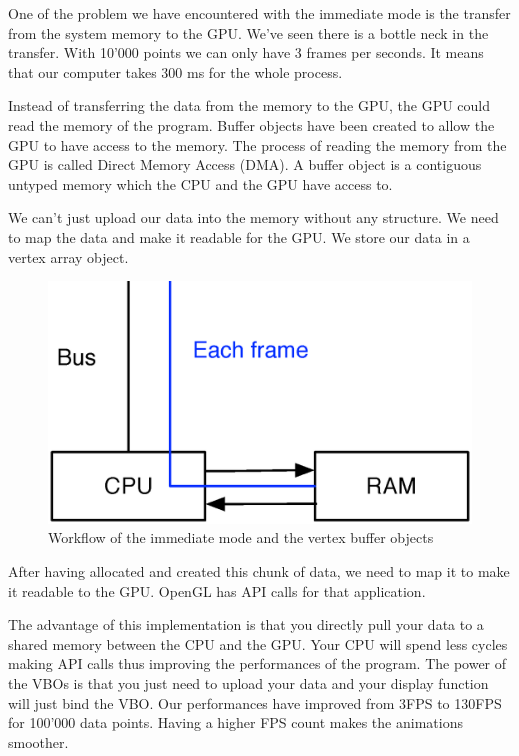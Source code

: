 One of the problem we have encountered with the immediate mode is the transfer from the system memory to the GPU.  We've seen there is a bottle neck in the transfer. With 10'000 points we can only have 3 frames per seconds. It means that our computer takes 300 ms for the whole process.

Instead of transferring the data from the memory to the GPU, the GPU could read the memory of the program. Buffer objects have been created to allow the GPU to have access to the memory. The process of reading the memory from the GPU is called Direct Memory Access (DMA). A buffer object is a contiguous untyped memory which the CPU and the GPU have access to.

We can't just upload our data into the memory without any structure. We need to map the data and make it readable for the GPU. We store our data in a vertex array object.


\begin{figure}[H]
  \centering
  \includegraphics[scale=0.4]{images/openglVBO.eps}
    \caption{Workflow of the immediate mode and the vertex buffer objects}
  \label{openglVBO}
\end{figure}

After having allocated and created this chunk of data, we need to map it to make it readable to the GPU. OpenGL has API calls for that application.

The advantage of this implementation is that you directly pull your data to a shared memory between the CPU and the GPU. Your CPU will spend less cycles making API calls thus improving the performances of the program. The power of the VBOs is that you just need to upload your data and your display function will just bind the VBO. Our performances have improved from 3FPS to 130FPS for 100'000 data points. Having a higher FPS count makes the animations smoother.

